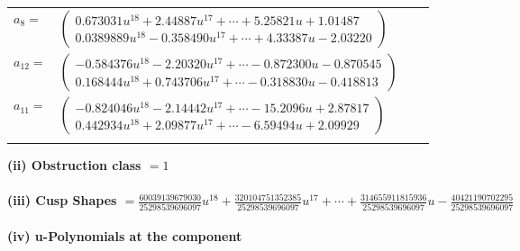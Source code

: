 \documentclass[1p]{elsarticle_modified}
\theoremstyle{definition}
\begin{document}
\begin{tabular}{m{7pt} m{180pt} m{7pt} m{180pt} }
\flushright $a_{8}=$&$\begin{pmatrix}0.673031 u^{18}+2.44887 u^{17}+\cdots+5.25821 u+1.01487\\0.0389889 u^{18}-0.358490 u^{17}+\cdots+4.33387 u-2.03220\end{pmatrix}$ \\
\flushright $a_{12}=$&$\begin{pmatrix}-0.584376 u^{18}-2.20320 u^{17}+\cdots-0.872300 u-0.870545\\0.168444 u^{18}+0.743706 u^{17}+\cdots-0.318830 u-0.418813\end{pmatrix}$ \\
\flushright $a_{11}=$&$\begin{pmatrix}-0.824046 u^{18}-2.14442 u^{17}+\cdots-15.2096 u+2.87817\\0.442934 u^{18}+2.09877 u^{17}+\cdots-6.59494 u+2.09929\end{pmatrix}$\\&\end{tabular}
\flushleft \textbf{(ii) Obstruction class $= 1$}\\~\\
\flushleft \textbf{(iii) Cusp Shapes $= \frac{60039139679030}{25298539696097} u^{18}+\frac{320104751352385}{25298539696097} u^{17}+\cdots+\frac{314655911815936}{25298539696097} u-\frac{40421190702295}{25298539696097}$}\\~\\
\newpage\renewcommand{\arraystretch}{1}
\flushleft \textbf{(iv) u-Polynomials at the component}\newline \\
\end{document}
